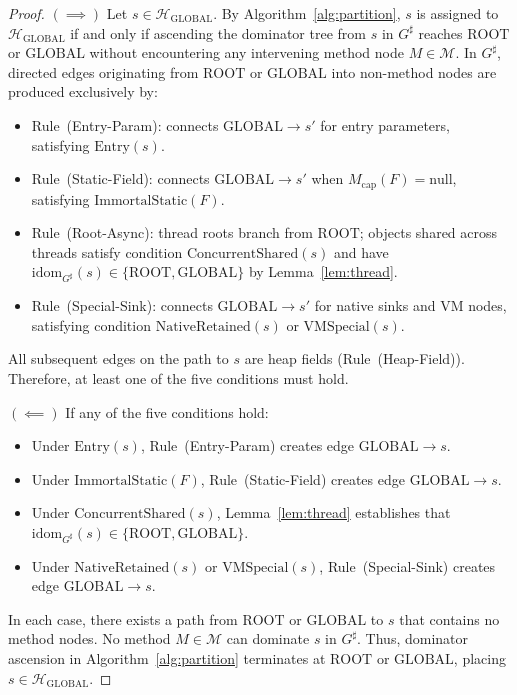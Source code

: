 \documentclass[12pt,a4paper]{article}
\newcommand{\GLOBAL}{\text{GLOBAL}}
\newcommand{\ROOT}{\text{ROOT}}
\newcommand{\idom}{\text{idom}}
\begin{document}
\begin{proof}
$(\implies)$ Let $s \in \mathcal{H}_{\GLOBAL}$. By Algorithm~\ref{alg:partition}, $s$ is assigned to $\mathcal{H}_{\GLOBAL}$ if and only if ascending the dominator tree from $s$ in $G^\sharp$ reaches $\ROOT$ or $\GLOBAL$ without encountering any intervening method node $M \in \mathcal{M}$. In $G^\sharp$, directed edges originating from $\ROOT$ or $\GLOBAL$ into non-method nodes are produced exclusively by:
\begin{itemize}[leftmargin=*]
  \item Rule~(Entry-Param): connects $\GLOBAL \to s'$ for entry parameters, satisfying $\text{Entry}(s)$.
  \item Rule~(Static-Field): connects $\GLOBAL \to s'$ when $M_{\text{cap}}(F) = \text{null}$, satisfying $\text{ImmortalStatic}(F)$.
  \item Rule~(Root-Async): thread roots branch from $\ROOT$; objects shared across threads satisfy condition $\text{ConcurrentShared}(s)$ and have $\idom_{G^\sharp}(s) \in \{\ROOT, \GLOBAL\}$ by Lemma~\ref{lem:thread}.
  \item Rule~(Special-Sink): connects $\GLOBAL \to s'$ for native sinks and VM nodes, satisfying condition $\text{NativeRetained}(s)$ or $\text{VMSpecial}(s)$.
\end{itemize}
All subsequent edges on the path to $s$ are heap fields (Rule~(Heap-Field)). Therefore, at least one of the five conditions must hold.

$(\impliedby)$ If any of the five conditions hold:
\begin{itemize}[leftmargin=*]
  \item Under $\text{Entry}(s)$, Rule~(Entry-Param) creates edge $\GLOBAL \to s$.
  \item Under $\text{ImmortalStatic}(F)$, Rule~(Static-Field) creates edge $\GLOBAL \to s$.
  \item Under $\text{ConcurrentShared}(s)$, Lemma~\ref{lem:thread} establishes that $\idom_{G^\sharp}(s) \in \{\ROOT, \GLOBAL\}$.
  \item Under $\text{NativeRetained}(s)$ or $\text{VMSpecial}(s)$, Rule~(Special-Sink) creates edge $\GLOBAL \to s$.
\end{itemize}
In each case, there exists a path from $\ROOT$ or $\GLOBAL$ to $s$ that contains no method nodes. No method $M \in \mathcal{M}$ can dominate $s$ in $G^\sharp$. Thus, dominator ascension in Algorithm~\ref{alg:partition} terminates at $\ROOT$ or $\GLOBAL$, placing $s \in \mathcal{H}_{\GLOBAL}$.
\end{proof}
\end{document}
